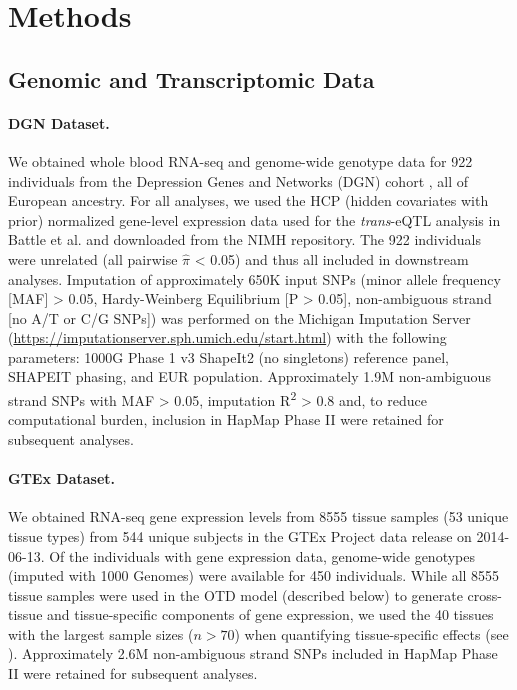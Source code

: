 \documentclass[10pt,letterpaper]{article}
\begin{document}
\section*{Methods}
\subsection*{Genomic and Transcriptomic
Data}\label{genomic-and-transcriptomic-data}

\paragraph*{DGN Dataset.}\label{dgn-dataset}

We obtained whole blood RNA-seq and genome-wide genotype data for 922
individuals from the Depression Genes and Networks (DGN) cohort
\cite{Battle_2013}, all of European ancestry. For all analyses, we used the HCP
(hidden covariates with prior) normalized gene-level expression data
used for the \emph{trans}-eQTL analysis in Battle et al. \cite{Battle_2013} and
downloaded from the NIMH repository. The 922 individuals were unrelated
(all pairwise \(\hat{\pi}\) \textless{} 0.05) and thus all included in
downstream analyses. Imputation of approximately 650K input SNPs (minor
allele frequency {[}MAF{]} \textgreater{} 0.05, Hardy-Weinberg
Equilibrium {[}P \textgreater{} 0.05{]}, non-ambiguous strand {[}no A/T
or C/G SNPs{]}) was performed on the Michigan
Imputation Server
(\url{https://imputationserver.sph.umich.edu/start.html}) \cite{Howie_2012,Fuchsberger_2014}
with the following parameters: 1000G Phase 1 v3 ShapeIt2 (no singletons)
reference panel, SHAPEIT phasing, and EUR population. Approximately 1.9M
non-ambiguous strand SNPs with MAF \textgreater{} 0.05, imputation
R\textsuperscript{2} \textgreater{} 0.8 and, to reduce computational
burden, inclusion in HapMap Phase II were retained for subsequent
analyses.

\paragraph*{GTEx Dataset.}\label{gtex-dataset}

We obtained RNA-seq gene expression levels from 8555 tissue samples (53
unique tissue types) from 544 unique subjects in the GTEx Project \cite{Ardlie_2015} 
data release on 2014-06-13. Of the individuals with gene
expression data, genome-wide genotypes (imputed with 1000 Genomes) were
available for 450 individuals. While all 8555 tissue samples were used
in the OTD model (described below) to generate cross-tissue and
tissue-specific components of gene expression, we used the 40 tissues
with the largest sample sizes ($n>70$) when quantifying tissue-specific effects (see ).
Approximately 2.6M non-ambiguous strand SNPs included in HapMap Phase II were retained for
subsequent analyses.
\end{document}
